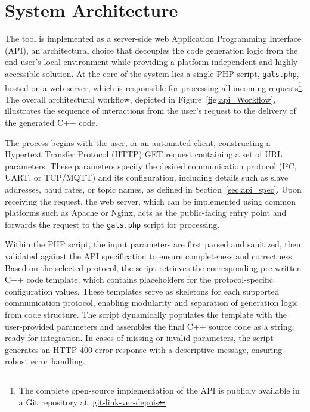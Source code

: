 
\section{System Architecture}
\label{sec:design_decisions}

The tool is implemented as a server-side web Application Programming Interface (API), an architectural choice that decouples the code generation logic from the end-user's local environment while providing a platform-independent and highly accessible solution. At the core of the system lies a single PHP script, \texttt{gals.php}, hosted on a web server, which is responsible for processing all incoming requests\footnote{The complete open-source implementation of the API is publicly available in a Git repository at: \url{git-link-ver-depois}}. The overall architectural workflow, depicted in Figure~\ref{fig:api_Workflow}, illustrates the sequence of interactions from the user's request to the delivery of the generated C++ code.

The process begins with the user, or an automated client, constructing a Hypertext Transfer Protocol (HTTP) GET request containing a set of URL parameters. These parameters specify the desired communication protocol (I²C, UART, or TCP/MQTT) and its configuration, including details such as slave addresses, baud rates, or topic names, as defined in Section~\ref{sec:api_spec}. Upon receiving the request, the web server, which can be implemented using common platforms such as Apache or Nginx, acts as the public-facing entry point and forwards the request to the \texttt{gals.php} script for processing.

Within the PHP script, the input parameters are first parsed and sanitized, then validated against the API specification to ensure completeness and correctness. Based on the selected protocol, the script retrieves the corresponding pre-written C++ code template, which contains placeholders for the protocol-specific configuration values. These templates serve as skeletons for each supported communication protocol, enabling modularity and separation of generation logic from code structure. The script dynamically populates the template with the user-provided parameters and assembles the final C++ source code as a string, ready for integration. In cases of missing or invalid parameters, the script generates an HTTP 400 error response with a descriptive message, ensuring robust error handling.

